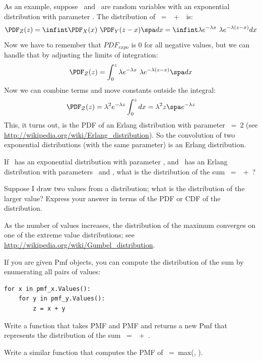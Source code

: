 \documentclass[12pt]{book}
\begin{document}
As an example, suppose \X~and \Y~are random variables with an
exponential distribution with parameter \mylambda.  
The distribution of \Z~=~\X~+~\Y~is:
%
\[ \PDF_Z(z) = \infint \PDF_X(x)~\PDF_Y(z-x) \spa dx = 
\infint \lambda e^{-\lambda x}~\lambda e^{-\lambda (z-x)} dx \]
%
Now we have to remember that $PDF_{expo}$ is 0 for all negative
values, but we can handle that by adjusting the limits of integration:
%
\[ \PDF_Z(z) = \int_{0}^{z} \lambda e^{-\lambda x}~\lambda e^{-\lambda (z-x)} \spa dx \]
%
Now we can combine terms and move constants outside the integral:
%
\[ \PDF_Z(z) = \lambda^2 e^{-\lambda z} \int_{0}^{z} dx = 
\lambda^2 z \spa e^{-\lambda z} \]
% 
This, it turns out, is the PDF of an Erlang distribution with
parameter \kk~=~2 (see \url{http://wikipedia.org/wiki/Erlang_distribution}).
So the convolution of two exponential distributions (with the same
parameter) is an Erlang distribution.

\begin{exercise}
If \X~has an exponential distribution with parameter
\mylambda, and \Y~has an Erlang distribution with parameters
\kk~and \mylambda, what is the distribution of the sum \Z~=~\X~+~\Y?

\end{exercise}

\begin{exercise}
Suppose I draw two values from a distribution; what is the distribution
of the larger value?  Express your answer in terms of the PDF or CDF of
the distribution.

As the number of values increases, the distribution of the maximum
converges on one of the extreme value distributions; see
\url{http://wikipedia.org/wiki/Gumbel_distribution}.

\end{exercise}

\begin{exercise}
If you are given Pmf objects, you can compute the distribution of
the sum by enumerating all pairs of values:
%
\begin{verbatim}
for x in pmf_x.Values():
    for y in pmf_y.Values():
        z = x + y
\end{verbatim}

Write a function that takes PMF and
PMF and returns a new Pmf that represents the distribution of
the sum \Z~=~\X~+~\Y.

Write a similar function that computes the PMF of \Z~=~max(\X, \Y).

\end{exercise}
\end{document}
